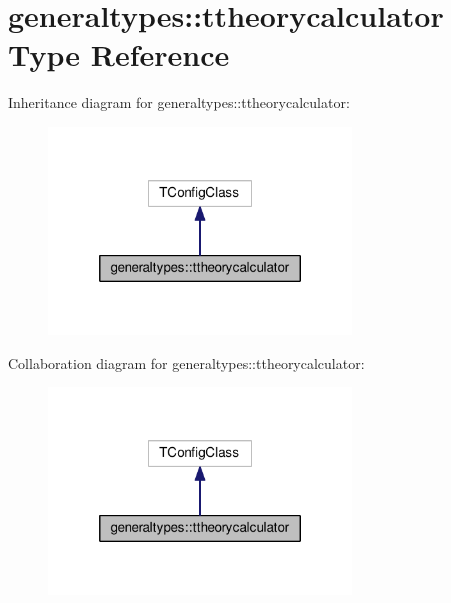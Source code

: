 \hypertarget{structgeneraltypes_1_1ttheorycalculator}{}\section{generaltypes\+:\+:ttheorycalculator Type Reference}
\label{structgeneraltypes_1_1ttheorycalculator}


Inheritance diagram for generaltypes\+:\+:ttheorycalculator\+:
\nopagebreak
\begin{figure}[H]
\begin{center}
\leavevmode
\includegraphics[width=228pt]{structgeneraltypes_1_1ttheorycalculator__inherit__graph}
\end{center}
\end{figure}


Collaboration diagram for generaltypes\+:\+:ttheorycalculator\+:
\nopagebreak
\begin{figure}[H]
\begin{center}
\leavevmode
\includegraphics[width=228pt]{structgeneraltypes_1_1ttheorycalculator__coll__graph}
\end{center}
\end{figure}
